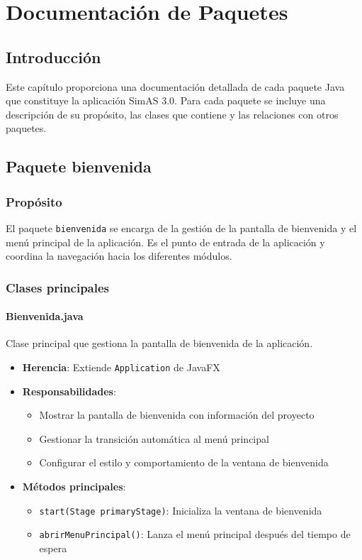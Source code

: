 \chapter{Documentación de Paquetes}\label{cap-documentacion-paquetes}

\section{Introducción}

Este capítulo proporciona una documentación detallada de cada paquete Java que constituye la aplicación SimAS 3.0. Para cada paquete se incluye una descripción de su propósito, las clases que contiene y las relaciones con otros paquetes.

\section{Paquete bienvenida}

\subsection{Propósito}

El paquete \texttt{bienvenida} se encarga de la gestión de la pantalla de bienvenida y el menú principal de la aplicación. Es el punto de entrada de la aplicación y coordina la navegación hacia los diferentes módulos.

\subsection{Clases principales}

\subsubsection{Bienvenida.java}

Clase principal que gestiona la pantalla de bienvenida de la aplicación.

\begin{itemize}
    \item \textbf{Herencia}: Extiende \texttt{Application} de JavaFX
    \item \textbf{Responsabilidades}:
    \begin{itemize}
        \item Mostrar la pantalla de bienvenida con información del proyecto
        \item Gestionar la transición automática al menú principal
        \item Configurar el estilo y comportamiento de la ventana de bienvenida
    \end{itemize}
    \item \textbf{Métodos principales}:
    \begin{itemize}
        \item \texttt{start(Stage primaryStage)}: Inicializa la ventana de bienvenida
        \item \texttt{abrirMenuPrincipal()}: Lanza el menú principal después del tiempo de espera
    \end{itemize}
\end{itemize}

